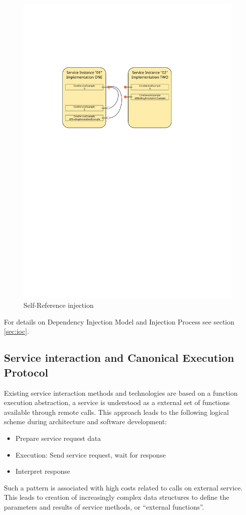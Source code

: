\begin{figure}[h!]
 \centering
 \includegraphics[width=1\textwidth]{instanceInjection02}
 \caption{Self-Reference injection}
 \label{fig:instanceinjection02}
\end{figure}

For details on Dependency Injection Model and Injection Process see section \ref{sec:ioc}.

\subsection{Service interaction and Canonical Execution Protocol}
\label{sec:intCallProtocol}

Existing service interaction methods and technologies are based on a function execution abstraction, a service is understood as a external set of functions available through remote calls. This approach leads to the following logical scheme during architecture and software development:
\begin{itemize}
 \item Prepare service request data
 \item Execution: Send service request, wait for response
 \item Interpret response
\end{itemize}
Such a pattern is associated with high costs related to calls on external service. This leads to creation of increasingly complex data structures to define the parameters and results of service methods, or ``external functions''.

